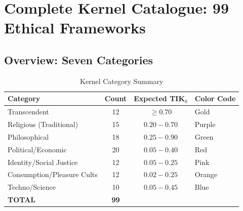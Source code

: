 \documentclass[11pt,a4paper]{article}
\theoremstyle{definition}
\theoremstyle{remark}
\begin{document}
\begin{center}
\end{center}

\newpage

\section{Complete Kernel Catalogue: 99 Ethical Frameworks}

\subsection{Overview: Seven Categories}

\begin{table}[H]
\centering
\caption{Kernel Category Summary}
\label{tab:kernel-summary}
\begin{tabular}{@{}lccl@{}}
\toprule
\textbf{Category} & \textbf{Count} & \textbf{Expected TIK$_8$} & \textbf{Color Code} \\
\midrule
Transcendent & 12 & $\geq 0.70$ & \colorbox{transcendent}{Gold} \\
Religious (Traditional) & 15 & $0.20 - 0.70$ & \colorbox{religious!30}{Purple} \\
Philosophical & 18 & $0.25 - 0.90$ & \colorbox{philosophical!30}{Green} \\
Political/Economic & 20 & $0.05 - 0.40$ & \colorbox{political!30}{Red} \\
Identity/Social Justice & 12 & $0.05 - 0.25$ & \colorbox{identity!30}{Pink} \\
Consumption/Pleasure Cults & 12 & $0.02 - 0.25$ & \colorbox{consumption!30}{Orange} \\
Techno/Science & 10 & $0.05 - 0.45$ & \colorbox{techno!30}{Blue} \\
\midrule
\textbf{TOTAL} & \textbf{99} & & \\
\bottomrule
\end{tabular}
\end{table}

\end{document}

